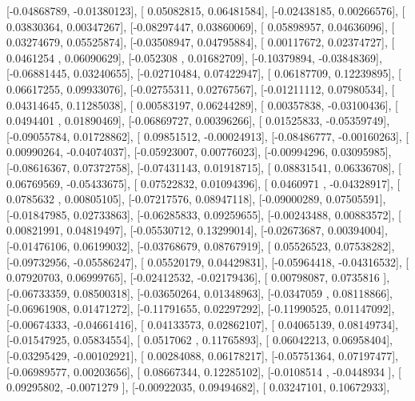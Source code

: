 \documentclass{article}
\begin{document}
       [-0.04868789, -0.01380123],
       [ 0.05082815,  0.06481584],
       [-0.02438185,  0.00266576],
       [ 0.03830364,  0.00347267],
       [-0.08297447,  0.03860069],
       [ 0.05898957,  0.04636096],
       [ 0.03274679,  0.05525874],
       [-0.03508947,  0.04795884],
       [ 0.00117672,  0.02374727],
       [ 0.0461254 ,  0.06090629],
       [-0.052308  ,  0.01682709],
       [-0.10379894, -0.03848369],
       [-0.06881445,  0.03240655],
       [-0.02710484,  0.07422947],
       [ 0.06187709,  0.12239895],
       [ 0.06617255,  0.09933076],
       [-0.02755311,  0.02767567],
       [-0.01211112,  0.07980534],
       [ 0.04314645,  0.11285038],
       [ 0.00583197,  0.06244289],
       [ 0.00357838, -0.03100436],
       [ 0.0494401 ,  0.01890469],
       [-0.06869727,  0.00396266],
       [ 0.01525833, -0.05359749],
       [-0.09055784,  0.01728862],
       [ 0.09851512, -0.00024913],
       [-0.08486777, -0.00160263],
       [ 0.00990264, -0.04074037],
       [-0.05923007,  0.00776023],
       [-0.00994296,  0.03095985],
       [-0.08616367,  0.07372758],
       [-0.07431143,  0.01918715],
       [ 0.08831541,  0.06336708],
       [ 0.06769569, -0.05433675],
       [ 0.07522832,  0.01094396],
       [ 0.0460971 , -0.04328917],
       [ 0.0785632 ,  0.00805105],
       [-0.07217576,  0.08947118],
       [-0.09000289,  0.07505591],
       [-0.01847985,  0.02733863],
       [-0.06285833,  0.09259655],
       [-0.00243488,  0.00883572],
       [ 0.00821991,  0.04819497],
       [-0.05530712,  0.13299014],
       [-0.02673687,  0.00394004],
       [-0.01476106,  0.06199032],
       [-0.03768679,  0.08767919],
       [ 0.05526523,  0.07538282],
       [-0.09732956, -0.05586247],
       [ 0.05520179,  0.04429831],
       [-0.05964418, -0.04316532],
       [ 0.07920703,  0.06999765],
       [-0.02412532, -0.02179436],
       [ 0.00798087,  0.0735816 ],
       [-0.06733359,  0.08500318],
       [-0.03650264,  0.01348963],
       [-0.0347059 ,  0.08118866],
       [-0.06961908,  0.01471272],
       [-0.11791655,  0.02297292],
       [-0.11990525,  0.01147092],
       [-0.00674333, -0.04661416],
       [ 0.04133573,  0.02862107],
       [ 0.04065139,  0.08149734],
       [-0.01547925,  0.05834554],
       [ 0.0517062 ,  0.11765893],
       [ 0.06042213,  0.06958404],
       [-0.03295429, -0.00102921],
       [ 0.00284088,  0.06178217],
       [-0.05751364,  0.07197477],
       [-0.06989577,  0.00203656],
       [ 0.08667344,  0.12285102],
       [-0.0108514 , -0.0448934 ],
       [ 0.09295802, -0.0071279 ],
       [-0.00922035,  0.09494682],
       [ 0.03247101,  0.10672933],
\end{document}
